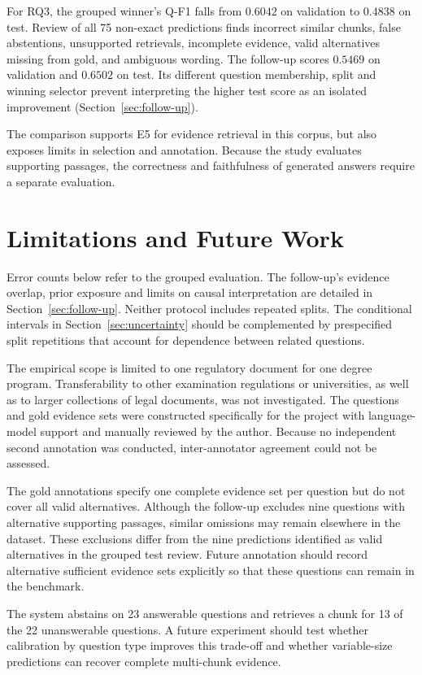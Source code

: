 \documentclass[11pt]{article}
\begin{document}
For RQ3, the grouped winner's Q-F1 falls from $0.6042$ on validation to $0.4838$ on test. Review of all 75 non-exact predictions finds incorrect similar chunks, false abstentions, unsupported retrievals, incomplete evidence, valid alternatives missing from gold, and ambiguous wording. The follow-up scores $0.5469$ on validation and $0.6502$ on test. Its different question membership, split and winning selector prevent interpreting the higher test score as an isolated improvement (Section~\ref{sec:follow-up}).

The comparison supports E5 for evidence retrieval in this corpus, but also exposes limits in selection and annotation. Because the study evaluates supporting passages, the correctness and faithfulness of generated answers require a separate evaluation.

\section{Limitations and Future Work}

Error counts below refer to the grouped evaluation. The follow-up's evidence overlap, prior exposure and limits on causal interpretation are detailed in Section~\ref{sec:follow-up}. Neither protocol includes repeated splits. The conditional intervals in Section~\ref{sec:uncertainty} should be complemented by prespecified split repetitions that account for dependence between related questions.

The empirical scope is limited to one regulatory document for one degree program. Transferability to other examination regulations or universities, as well as to larger collections of legal documents, was not investigated. The questions and gold evidence sets were constructed specifically for the project with language-model support and manually reviewed by the author. Because no independent second annotation was conducted, inter-annotator agreement could not be assessed.

The gold annotations specify one complete evidence set per question but do not cover all valid alternatives. Although the follow-up excludes nine questions with alternative supporting passages, similar omissions may remain elsewhere in the dataset. These exclusions differ from the nine predictions identified as valid alternatives in the grouped test review. Future annotation should record alternative sufficient evidence sets explicitly so that these questions can remain in the benchmark.

The system abstains on 23 answerable questions and retrieves a chunk for 13 of the 22 unanswerable questions. A future experiment should test whether calibration by question type improves this trade-off and whether variable-size predictions can recover complete multi-chunk evidence.
\end{document}
